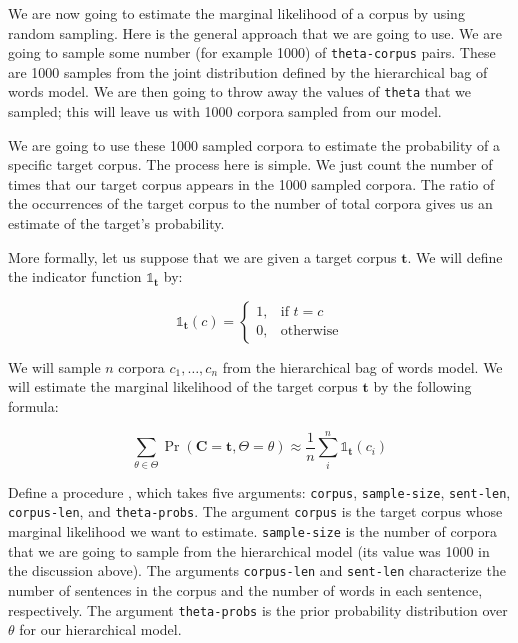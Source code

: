 \documentclass[10pt]{article}
\newcommand{\required}[1]{{\color{blue}{#1}}}
\begin{document}
\noindent We are now going to estimate the marginal likelihood of a
corpus by using random sampling. Here is the general approach that we
are going to use. We are going to sample some number (for example
1000) of \texttt{theta-corpus} pairs. These are 1000 samples from the
joint distribution defined by the hierarchical bag of words model. We
are then going to throw away the values of \texttt{theta} that we
sampled; this will leave us with 1000 corpora sampled from our model.

We are going to use these 1000 sampled corpora to estimate
the probability of a specific target corpus. The process here is
simple. We just count the number of times that our target corpus
appears in the 1000 sampled corpora. The ratio of the occurrences of
the target corpus to the number of total corpora gives us an estimate
of the target's probability.

More formally, let us suppose that we are given a target
corpus $\mathbf{t}$. We will define the indicator function
$\mathds{1}_{\mathbf{t}}$ by:

\begin{equation}
\mathds{1}_{\mathbf{t}}(c) =
\begin{cases}
    1, & \text{if } t = c\\
    0, & \text{otherwise}
\end{cases}
\end{equation}

\noindent We will sample $n$ corpora $c_1,\ldots,c_n$ from the
hierarchical bag of words model. We will estimate the marginal
likelihood of the target corpus $\mathbf{t}$ by the following formula:

\begin{equation}
\label{eq:montecarlo-marginal}
\sum_{\theta \in \Theta} \Pr(\mathbf{C}=\mathbf{t}, \Theta=\theta)  \approx \frac{1}{n} \sum_{i}^{n}\mathds{1}_{\mathbf{t}}(c_i) 
\end{equation}

\noindent Define a procedure
\required{\texttt{estimate-corpus-marginal}}, which takes five
arguments: \texttt{corpus}, \texttt{sample-size}, \texttt{sent-len},
\texttt{corpus-len}, and \texttt{theta-probs}. The argument
\texttt{corpus} is the target corpus whose marginal likelihood we want
to estimate. \texttt{sample-size} is the number of corpora that we are
going to sample from the hierarchical model (its value was 1000 in the
discussion above). The arguments \texttt{corpus-len} and
\texttt{sent-len} characterize the number of sentences in the corpus
and the number of words in each sentence, respectively. The argument
\texttt{theta-probs} is the prior probability distribution over
$\theta$ for our hierarchical model.
\end{document}
